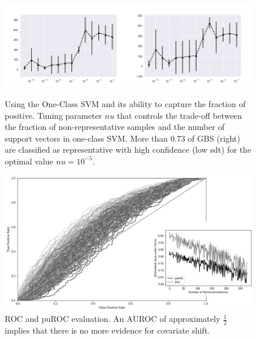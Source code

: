 \begin{figure}[ht]
	\begin{center}
		\includegraphics[scale=0.50,angle=0]{fig/occfigure}
		\label{occ}
		\caption{Using the One-Class SVM and its ability to capture the fraction of positive. Tuning parameter \(nu\) that controls the trade-off between the fraction of non-representative samples and the number of support vectors in one-class SVM. More than 0.73 of GBS (right) are classified as representative with high confidence (low sdt) for the optimal value \(nu = 10^{-5}\).}
	\end{center}
\end{figure}

\begin{figure}[ht]
\centering
   \includegraphics[scale=0.48,angle=0]{fig/res1}
\caption{ROC and puROC evaluation. An AUROC of approximately \(\frac{1}{2}\) implies that there is no more evidence for covariate shift.}
   \label{fig:Ng1} 
\end{figure}

